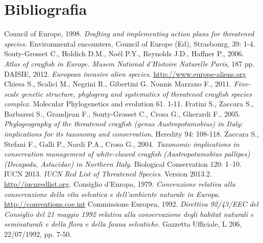 \documentclass[10pt,twoside,openany,x11names,svgnames,italian,a5paper,dvipsnames,table]{memoir}
\newcommand\chapterillustration{}
\begin{document}
\chapter{Bibliografia}
\renewcommand\chapterillustration{}
\renewcommand*{\bibname}{}
\begingroup
\renewcommand{\addcontentsline}[3]{}%
\renewcommand{\section}[2]{}%
\begin{thebibliography}{9}
\footnotesize
{} Council of Europe, 1998. \emph{Drafting and implementing action plans for threatened species.} Environmental encounters, Council of Europe (Ed), Strasbourg, 39: 1-4.
 Souty-Grosset C., Holdich D.M., Noël P.Y., Reynolds J.D., Haffner P., 2006. \emph{Atlas of crayfish in Europe. Musem National d’Histoire Naturelle Paris}, 187 pp.
 DAISIE, 2012. \emph{European invasive alien species}. \url{http://www.europe-aliens.org}
 Chiesa S., Scalici M., Negrini R., Gibertini G. Nonnis Marzano F., 2011. \emph{Fine-scale genetic structure, phylogeny and systematics of threatened crayfish species complex}. Molecular Phylogenetics and evolution 61. 1-11.
 Fratini S., Zaccara S., Barbaresi S., Grandjean F., Souty-Grosset C., Crosa G.,  Gherardi F., 2005. \emph{Phylogeography of the threatened crayfish (genus \emph{Austropotamobius}) in Italy: implications for its taxonomy and conservation}. Heredity 94: 108-118.
 Zaccara S., Stefani F., Galli P., Nardi P.A., Crosa G., 2004. \emph{Taxonomic implications in conservation management of white-clawed crayfish (\emph{Austropotamobius pallipes}) (\emph{Decapoda}, \emph{Astacidae}) in Northern Italy}. Biological Conservation 120: 1–10.
 IUCN 2013. \emph{IUCN Red List of Threatened Species}. Version 2013.2. \url{http//iucnredlist.org}.
 Consiglio d’Europa, 1979. \emph{Convenzione relativa alla conservazione della vita selvatica e dell’ambiente naturale in Europa}. \url{http://conventions.coe.int}
 Commissione Europea, 1992. \emph{Direttiva 92/43/EEC del Consiglio del 21 maggio 1992 relativa alla conservazione degli habitat naturali e seminaturali e della flora e della fauna selvatiche}. Gazzetta Ufficiale, L 206, 22/07/1992, pp. 7-50.

\end{thebibliography}
\end{document}
